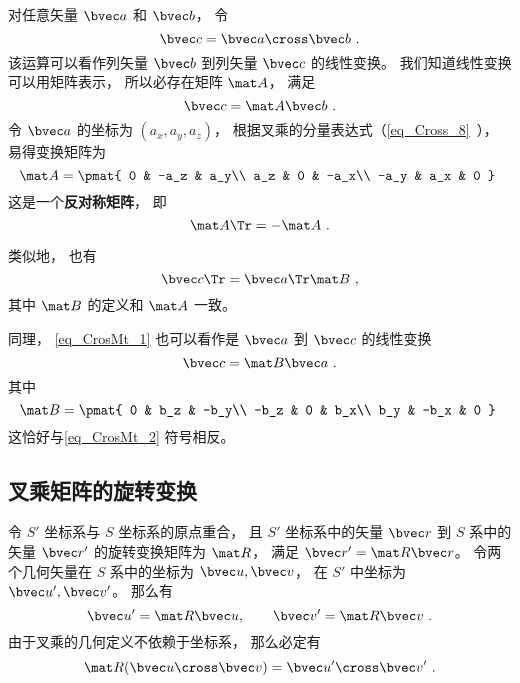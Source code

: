 
对任意矢量 $\bvec a$ 和 $\bvec b$， 令
\begin{equation}\label{eq_CrosMt_1}
\bvec c = \bvec a \cross \bvec b~.
\end{equation}
该运算可以看作列矢量 $\bvec b$ 到列矢量 $\bvec c$ 的线性变换。 我们知道线性变换可以用矩阵表示， 所以必存在矩阵 $\mat A$， 满足
\begin{equation}\label{eq_CrosMt_3}
\bvec c = \mat A \bvec b~.
\end{equation}
令 $\bvec a$ 的坐标为 $(a_x, a_y, a_z)$， 根据叉乘的分量表达式（\autoref{eq_Cross_8}~）， 易得变换矩阵为
\begin{equation}\label{eq_CrosMt_2}
\mat A = \pmat{
0 & -a_z & a_y\\
a_z & 0 & -a_x\\
-a_y & a_x & 0
}~\end{equation}
这是一个\textbf{反对称矩阵}， 即
\begin{equation}
\mat A\Tr = -\mat A~.
\end{equation}

类似地， 也有
\begin{equation}
\bvec c\Tr = \bvec a\Tr \mat B~,
\end{equation}
其中 $\mat B$ 的定义和 $\mat A$ 一致。

同理， \autoref{eq_CrosMt_1} 也可以看作是 $\bvec a$ 到 $\bvec c$ 的线性变换
\begin{equation}
\bvec c = \mat B \bvec a~.
\end{equation}
其中
\begin{equation}
\mat B = \pmat{
0 & b_z & -b_y\\
-b_z & 0 & b_x\\
b_y & -b_x & 0
}~
\end{equation}
这恰好与\autoref{eq_CrosMt_2} 符号相反。

\subsection{叉乘矩阵的旋转变换}\label{sub_CrosMt_1}
令 $S'$ 坐标系与 $S$ 坐标系的原点重合， 且 $S'$ 坐标系中的矢量 $\bvec r$ 到 $S$ 系中的矢量 $\bvec r'$ 的旋转变换矩阵为 $\mat R$， 满足 $\bvec r' = \mat R\bvec r$。 令两个几何矢量在 $S$ 系中的坐标为 $\bvec u, \bvec v$， 在 $S'$ 中坐标为 $\bvec u', \bvec v'$。 那么有
\begin{equation}
\bvec u' = \mat R\bvec u, \qquad
\bvec v' = \mat R\bvec v~.
\end{equation}
由于叉乘的几何定义不依赖于坐标系， 那么必定有
\begin{equation}
\mat R(\bvec u\cross \bvec v) = \bvec u'\cross \bvec v'~.
\end{equation}

